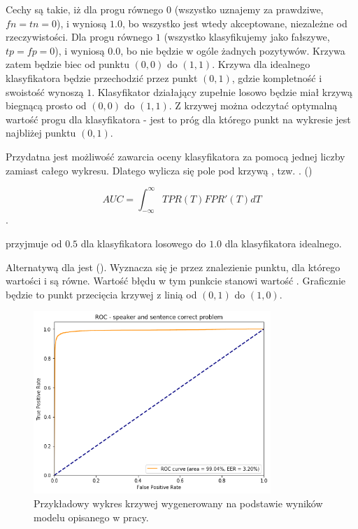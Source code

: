 Cechy  są takie, iż dla progu równego $0$ (wszystko uznajemy za prawdziwe, $fn = tn = 0$),
 i 
wyniosą $1.0$, bo wszystko jest wtedy akceptowane, niezależne od rzeczywistości.
Dla progu równego $1$ (wszystko klasyfikujemy jako fałszywe, $tp = fp = 0$),
 i  wyniosą $0.0$, bo nie będzie w ogóle żadnych pozytywów.
Krzywa zatem będzie biec od punktu $(0, 0)$ do $(1, 1)$. Krzywa dla idealnego klasyfikatora
będzie przechodzić przez punkt $(0, 1)$, gdzie kompletność i swoistość wynoszą $1$. Klasyfikator
działający zupełnie losowo będzie miał krzywą biegnącą prosto od $(0, 0)$ do $(1, 1)$. Z krzywej
 można odczytać optymalną wartość progu dla klasyfikatora - jest to próg dla którego punkt
na wykresie jest najbliżej punktu $(0, 1)$.

Przydatna jest możliwość zawarcia oceny klasyfikatora za pomocą jednej liczby zamiast całego wykresu.
Dlatego wylicza się pole pod krzywą , tzw. . ()

$$\mathit{AUC} = \int_{-\infty}^{\infty} \mathit{TPR}(T) \mathit{FPR}'(T) dT$$.

 przyjmuje od $0.5$ dla klasyfikatora losowego do $1.0$ dla klasyfikatora idealnego.

Alternatywą dla  jest  (). Wyznacza się je
przez znalezienie punktu, dla którego wartości  i  są równe. Wartość błędu
w tym punkcie stanowi wartość . Graficznie będzie to punkt przecięcia krzywej 
z linią od $(0, 1)$ do $(1, 0)$.

\begin{figure}[H]
    \centering
    \includegraphics[width=0.8\textwidth]{images/2_2_b_roc_example}
    \caption{Przykładowy wykres krzywej  wygenerowany na podstawie wyników modelu  opisanego w pracy.}
    \label{fig:2_2_b_roc_example}
\end{figure}

